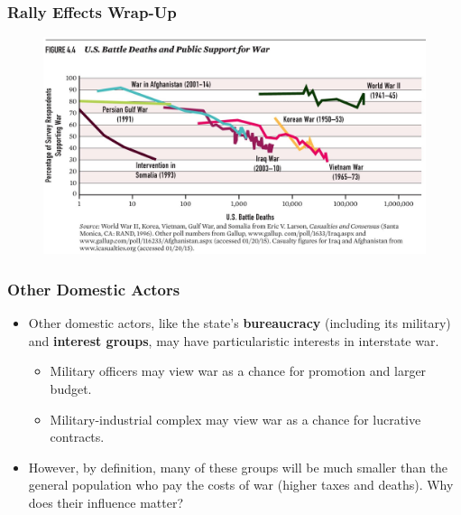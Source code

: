 \documentclass{beamer}
\begin{document}
\begin{frame} 
	\frametitle{\LARGE{Rally Effects Wrap-Up}}
	\begin{figure}[ht!]
		\centering
		\includegraphics[width=\textwidth,height=0.9\textheight,keepaspectratio]{USappbd.jpg}
	\end{figure}
\end{frame}

\begin{frame} 
	\frametitle{\LARGE{Other Domestic Actors}}
	\begin{itemize}
		\item Other domestic actors, like the state's \textbf{bureaucracy} (including its military) and \textbf{interest groups}, may have particularistic interests in interstate war. \pause
		\begin{itemize}
			\item Military officers may view war as a chance for promotion and larger budget. \pause
			\item Military-industrial complex may view war as a chance for lucrative contracts. \pause
		\end{itemize}
	\item However, by definition, many of these groups will be much smaller than the general population who pay the costs of war (higher taxes and deaths). Why does their influence matter? 
	\end{itemize}
\end{frame}
\end{document}

